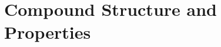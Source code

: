 \documentclass[../chem.tex]{subfiles}
\begin{document}
\chapter{Compound Structure and Properties}
\end{document}

